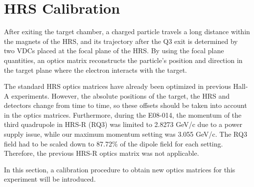 \section{HRS Calibration}
 After exiting the target chamber, a charged particle travels a long distance within the magnets of the HRS, and its trajectory after the Q3 exit is determined by two VDCs placed at the focal plane of the HRS. By using the focal plane quantities, an optics matrix reconstructs the particle's position and direction in the target plane where the electron interacts with the target.

 The standard HRS optics matrices have already been optimized in previous Hall-A experiments. However, the absolute positions of the target, the HRS and detectors change from time to time, so these offsets should be taken into account in the optics matrices. Furthermore, during the E08-014, the momentum of the third quadrupole in HRS-R (RQ3) was limited to 2.8273 GeV/c due to a power supply issue, while our maximum momentum setting was 3.055 GeV/c. The RQ3 field had to be scaled down to 87.72\% of the dipole field for each setting. Therefore, the previous HRS-R optics matrix was not applicable. 
 
 In this section, a calibration procedure to obtain new optics matrices for this experiment will be introduced.

